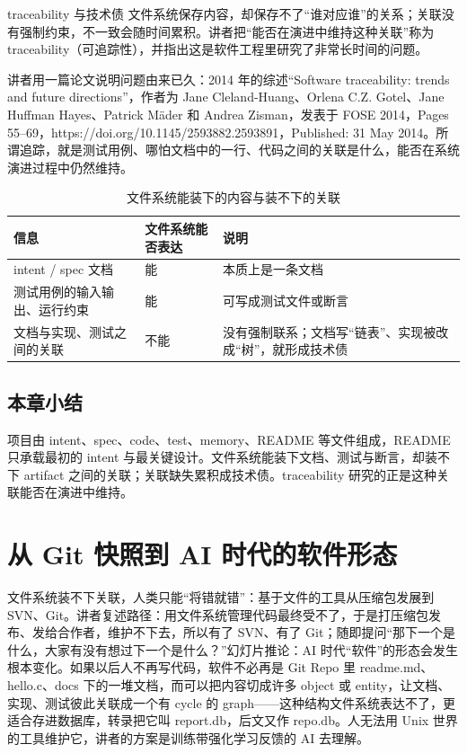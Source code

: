 \documentclass[a4paper]{article}
\begin{document}
\begin{knowledgebox}{traceability 与技术债}
文件系统保存内容，却保存不了“谁对应谁”的关系；关联没有强制约束，不一致会随时间累积。讲者把“能否在演进中维持这种关联”称为 traceability（可追踪性），并指出这是软件工程里研究了非常长时间的问题。
\end{knowledgebox}

讲者用一篇论文说明问题由来已久：2014 年的综述“Software traceability: trends and future directions”，作者为 Jane Cleland-Huang、Orlena C.Z. Gotel、Jane Huffman Hayes、Patrick Mäder 和 Andrea Zisman，发表于 FOSE 2014，Pages 55--69，https://doi.org/10.1145/2593882.2593891，Published: 31 May 2014。所谓追踪，就是测试用例、哪怕文档中的一行、代码之间的关联是什么，能否在系统演进过程中仍然维持。

\begin{table}[H]
\centering
\begin{tabular}{p{3.6cm}p{2.8cm}p{7.2cm}}
\toprule
信息 & 文件系统能否表达 & 说明 \\
\midrule
intent / spec 文档 & 能 & 本质上是一条文档 \\
测试用例的输入输出、运行约束 & 能 & 可写成测试文件或断言 \\
文档与实现、测试之间的关联 & 不能 & 没有强制联系；文档写“链表”、实现被改成“树”，就形成技术债 \\
\bottomrule
\end{tabular}
\caption{文件系统能装下的内容与装不下的关联}
\end{table}

\subsection{本章小结}
项目由 intent、spec、code、test、memory、README 等文件组成，README 只承载最初的 intent 与最关键设计。文件系统能装下文档、测试与断言，却装不下 artifact 之间的关联；关联缺失累积成技术债。traceability 研究的正是这种关联能否在演进中维持。

\section{从 Git 快照到 AI 时代的软件形态}

文件系统装不下关联，人类只能“将错就错”：基于文件的工具从压缩包发展到 SVN、Git。讲者复述路径：用文件系统管理代码最终受不了，于是打压缩包发布、发给合作者，维护不下去，所以有了 SVN、有了 Git；随即提问“那下一个是什么，大家有没有想过下一个是什么？”幻灯片推论：AI 时代“软件”的形态会发生根本变化。如果以后人不再写代码，软件不必再是 Git Repo 里 readme.md、hello.c、docs 下的一堆文档，而可以把内容切成许多 object 或 entity，让文档、实现、测试彼此关联成一个有 cycle 的 graph——这种结构文件系统表达不了，更适合存进数据库，转录把它叫 report.db，后文又作 repo.db。人无法用 Unix 世界的工具维护它，讲者的方案是训练带强化学习反馈的 AI 去理解。
\end{document}

